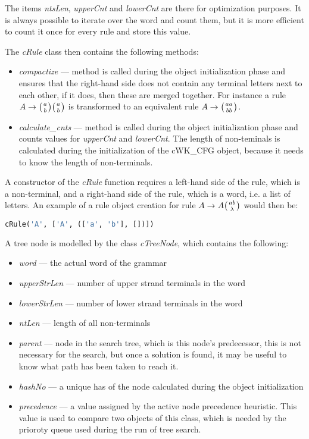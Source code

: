 The items \textit{ntsLen}, \textit{upperCnt} and \textit{lowerCnt} are there for optimization purposes. It is always possible to iterate over the word and count them, but it is more efficient to count it once for every rule and store this value.

The \textit{cRule} class then contains the following methods:
\begin{itemize}
  \item{\textit{compactize} --- method is called during the object initialization phase and ensures that the right-hand side does not contain any terminal letters next to each other, if it does, then these are merged together. For instance a rule $A \rightarrow \wkpair{a}{b} \wkpair{a}{b}$ is transformed to an equivalent rule $A \rightarrow \wkpair{aa}{bb}$.}
  \item{\textit{calculate\_cnts} --- method is called during the object initialization phase and counts values for \textit{upperCnt} and \textit{lowerCnt}}. The length of non-teminals is calculated during the initialization of the cWK\_CFG object, because it needs to know the length of non-terminals.
\end{itemize}

A constructor of the \textit{cRule} function requires a left-hand side of the rule, which is a non-terminal, and a right-hand side of the rule, which is a word, i.e. a list of letters. An example of a rule object creation for rule $A \rightarrow A \wkpair{ab}{\lambda}$ would then be:

\begin{lstlisting}[language=Python]
  cRule('A', ['A', (['a', 'b'], [])])
\end{lstlisting}

\bigskip

A tree node is modelled by the class \textit{cTreeNode}, which contains the following:
\begin{itemize}
  \item{\textit{word} --- the actual word of the grammar}
  \item{\textit{upperStrLen} --- number of upper strand terminals in the word}
  \item{\textit{lowerStrLen} --- number of lower strand terminals in the word}
  \item{\textit{ntLen} --- length of all non-terminals}
  \item{\textit{parent} --- node in the search tree, which is this node's  predecessor, this is not necessary for the search, but once a solution is found, it may be useful to know what path has been taken to reach it.}
  \item{\textit{hashNo} --- a unique has of the node calculated during the object initialization}
  \item{\textit{precedence} --- a value assigned by the active node precedence heuristic. This value is used to compare two objects of this class, which is needed by the prioroty queue used during the run of tree search.}
\end{itemize}

